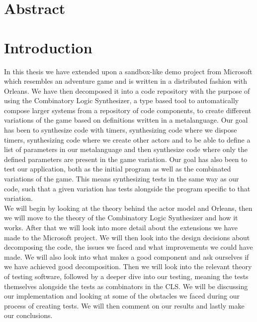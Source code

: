 \section{Abstract}

\section{Introduction}\label{intro}
In this thesis we have extended upon a sandbox-like demo project from Microsoft \cite{AdventureGame} which resembles an adventure game and is written in a distributed fashion with Orleans. We have then decomposed it into a code repository with the  purpose of using the Combinatory Logic Synthesizer, a type based tool to automatically compose larger systems from a repository of code components, to create different variations of the game based on definitions written in a metalanguage. Our goal has been to synthesize code with timers, synthesizing code where we dispose timers, synthesizing code where we create other actors and to be able to define a list of parameters in our metalanguage and then synthesize code where only the defined parameters are present in the game variation. Our goal has also been to test our application, both as the initial program as well as the combinated variations of the game. This means synthesizing tests in the same way as our code, such that a given variation has tests alongside the program specific to that variation. \\
We will begin by looking at the theory behind the actor model and Orleans, then we will move to the theory of the Combinatory Logic Synthesizer and how it works. After that we will look into more detail about the extensions we have made to the Microsoft project. We will then look into the design decisions about decomposing the code, the issues we faced and what improvements we could have made. We will also look into what makes a good component and ask ourselves if we have achieved good decomposition. 
Then we will look into the relevant theory of testing software, followed by a deeper dive into our testing, meaning the tests themselves alongside the tests as combinators in the CLS. We will be discussing our implementation and looking at some of the obstacles we faced during our process of creating tests. We will then comment on our results and lastly make our conclusions.